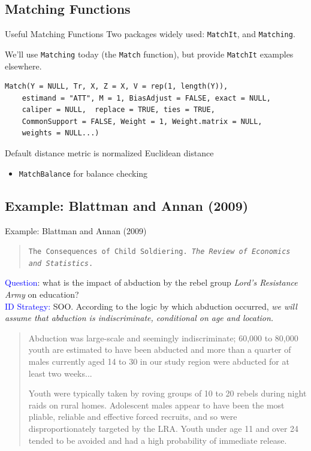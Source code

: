 \documentclass[xcolor=dvipsnames]{beamer}
\begin{document}
\subsection{Matching Functions}
\begin{frame}[fragile]{Useful Matching Functions}
\small 
Two packages widely used: \texttt{MatchIt}, and 
\texttt{Matching}.

 We'll use \texttt{Matching} today (the \texttt{Match} function), but provide \texttt{MatchIt} examples elsewhere.

\footnotesize
\begin{verbatim}
Match(Y = NULL, Tr, X, Z = X, V = rep(1, length(Y)), 
    estimand = "ATT", M = 1, BiasAdjust = FALSE, exact = NULL, 
    caliper = NULL,  replace = TRUE, ties = TRUE, 
    CommonSupport = FALSE, Weight = 1, Weight.matrix = NULL, 
    weights = NULL...) 
\end{verbatim}

Default distance metric is normalized Euclidean distance

\begin{itemize}
\itemsep1pt\parskip0pt
\item
  \texttt{MatchBalance} for balance checking
\end{itemize}
\end{frame}

\subsection{Example: Blattman and Annan (2009)}
\begin{frame}{Example: Blattman and Annan (2009)}
\small
\begin{quote}
\texttt{The Consequences of
Child Soldiering. \textit{The Review of Economics and Statistics}.}
\end{quote}
\small
\bigskip
{} \textcolor{Blue}{Question}: what is the impact of abduction by the rebel group \textit{Lord's Resistance Army} on education? \\
\bigskip
{} \textcolor{Blue}{ID Strategy:} SOO. According to the logic by which abduction occurred, \emph{we will assume that abduction is indiscriminate, conditional on age and location.}

\footnotesize
\begin{quote}
Abduction was large-scale and seemingly indiscriminate; 60,000 to 80,000 youth are estimated to have been abducted and more than a quarter of males currently aged 14 to 30 in our study region were abducted for at least two weeks...

Youth were typically taken by roving groups of 10 to 20 rebels during night raids on rural homes. Adolescent males appear to have been the most pliable, reliable and effective forced recruits, and so were disproportionately targeted by the LRA. Youth under age 11 and over 24 tended to be avoided and had a high probability of immediate release. 
\end{quote}
\end{frame}
\end{document}
